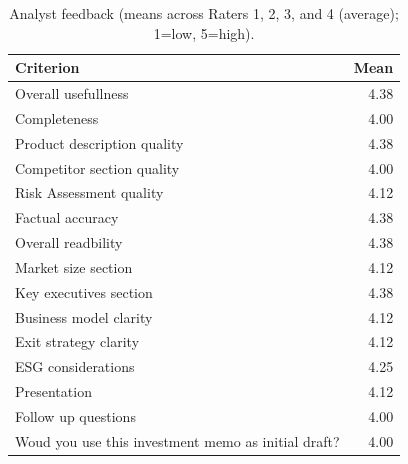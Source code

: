 \begin{table}[H]
\centering
\small
\caption{Analyst feedback (means across Raters 1, 2, 3, and 4 (average); 1=low, 5=high).}\n\label{tab:analyst-feedback}
\begin{tabular}{l r}\toprule
Criterion & Mean \\ \midrule
Overall usefullness & 4.38 \\ 
Completeness & 4.00 \\ 
Product description quality & 4.38 \\ 
Competitor section quality & 4.00 \\ 
Risk Assessment quality & 4.12 \\ 
Factual accuracy & 4.38 \\ 
Overall readbility & 4.38 \\ 
Market size section & 4.12 \\ 
Key executives section & 4.38 \\ 
Business model clarity & 4.12 \\ 
Exit strategy clarity & 4.12 \\ 
ESG considerations & 4.25 \\ 
Presentation & 4.12 \\ 
Follow up questions & 4.00 \\ 
Woud you use this investment memo as initial draft? & 4.00 \\ 
\bottomrule\end{tabular}\n\end{table}
